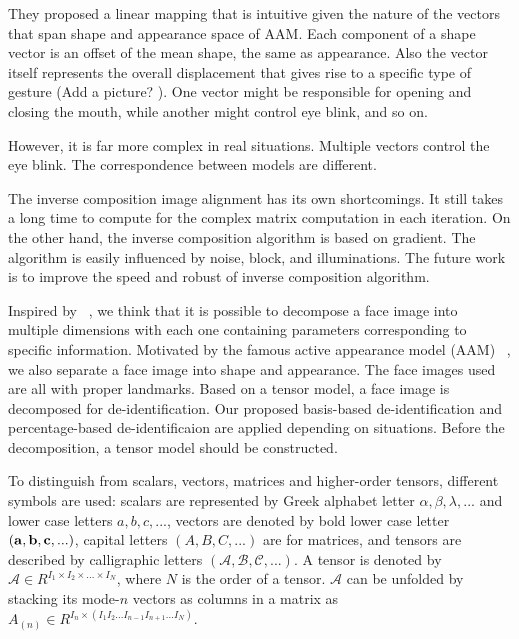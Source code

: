 They proposed a linear mapping that is intuitive given the nature of the vectors that span shape and appearance space of AAM. Each component of a shape vector is an offset of the mean shape, the same as appearance. Also the vector itself represents the overall displacement that gives rise to a specific type of gesture (Add a picture? ). One vector might be responsible for opening and closing the mouth, while another might control eye blink, and so on. ~\cite{Theobald07}

However, it is far more complex in real situations. Multiple vectors control the eye blink. The correspondence between models are different. 



The inverse composition image alignment has its own shortcomings. It still takes a long time to compute for the complex matrix computation in each iteration. On the other hand, the inverse composition algorithm is based on gradient. The algorithm is easily influenced by noise, block, and illuminations. The future work is to improve the speed and robust of inverse composition algorithm. 






		Inspired by ~\cite{Vasi02}, we think that it is possible to decompose a face image into multiple dimensions with each one containing parameters corresponding to specific information. Motivated by the famous active appearance model (AAM) ~\cite{Matthews_04}, we also separate a face image into shape and appearance. The face images used are all with proper landmarks. Based on a tensor model, a face image is decomposed for de-identification. Our proposed basis-based de-identification and percentage-based de-identificaion are applied depending on situations. Before the decomposition, a tensor model should be constructed. 

		To distinguish from scalars, vectors, matrices and higher-order tensors, different symbols are used: scalars are represented by Greek alphabet letter $\alpha,\beta,\lambda,...$ and lower case letters $a,b,c,...$, vectors are denoted by bold lower case letter ${\bf (a,b,c,...)}$, capital letters $(A,B,C,...)$ are for matrices, and tensors are described by calligraphic letters $(\mathcal{A,B,C,...})$. A tensor is denoted by $\mathcal{A} \in R^{I_1 \times I_2 \times ... \times I_N}$, where $N$ is the order of a tensor. $\mathcal{A}$ can be unfolded by stacking its mode-$n$ vectors as columns in a matrix as $A_{(n)} \in R^{I_n \times (I_1I_2...I_{n-1}I_{n+1}...I_N)}$. 

